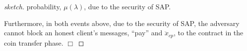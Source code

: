 \begin{proof}[sketch]
probability, $\mu(\lambda)$, due to the security of SAP. 
     
  
Furthermore, in   both  events above, due to the security of SAP, the adversary cannot block an honest client's  messages, ``pay'' and $\ddot{x}_{\scriptscriptstyle cp}$, to the contract in the coin transfer phase.
  \hfill\(\Box\)\end{proof}

